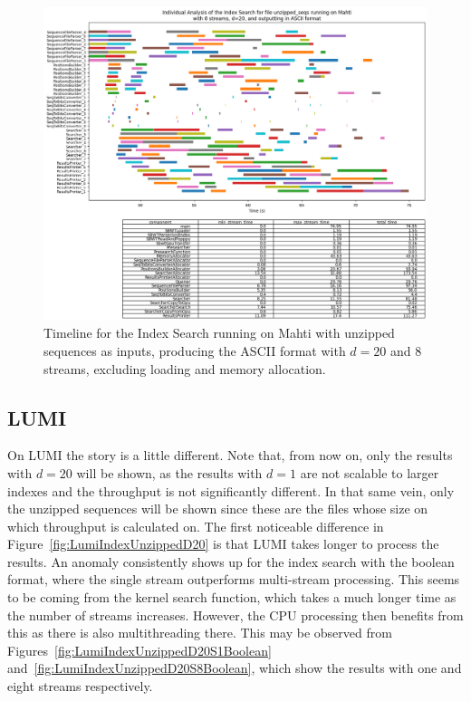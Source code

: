 \begin{figure}[t]
  \centering
  \includegraphics[width=\textwidth]{images/MahtiIndexUnzippedD20S8ASCII.png}
  \caption{Timeline for the Index Search running on Mahti with unzipped sequences as inputs, producing the ASCII format with $d=20$ and 8 streams, excluding loading and memory allocation.}\label{fig:MahtiIndexUnzippedD20S8ASCII}
\end{figure}

\subsection{LUMI}

On LUMI the story is a little different.
Note that, from now on, only the results with $d=20$ will be shown, as the results with $d=1$ are not scalable to larger indexes and the throughput is not significantly different.
In that same vein, only the unzipped sequences will be shown since these are the files whose size on which throughput is calculated on.
The first noticeable difference in Figure~\ref{fig:LumiIndexUnzippedD20} is that LUMI takes longer to process the results.
An anomaly consistently shows up for the index search with the boolean format, where the single stream outperforms multi-stream processing.
This seems to be coming from the kernel search function, which takes a much longer time as the number of streams increases.
However, the CPU processing then benefits from this as there is also multithreading there.
This may be observed from Figures~\ref{fig:LumiIndexUnzippedD20S1Boolean} and~\ref{fig:LumiIndexUnzippedD20S8Boolean}, which show the results with one and eight streams respectively.


